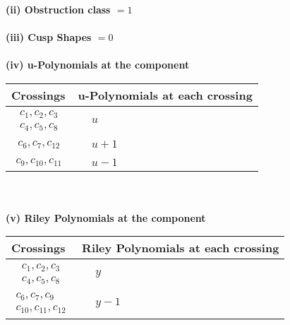 \documentclass[1p]{elsarticle_modified}
\theoremstyle{definition}
\begin{document}
\flushleft \textbf{(ii) Obstruction class $= 1$}\\~\\
\flushleft \textbf{(iii) Cusp Shapes $= 0$}\\~\\
\newpage\renewcommand{\arraystretch}{1}
\flushleft \textbf{(iv) u-Polynomials at the component}\newline \\
\begin{tabular}{m{50pt}|m{274pt}}
Crossings & \hspace{64pt}u-Polynomials at each crossing \\
\hline $$\begin{aligned}c_{1},c_{2},c_{3}\\c_{4},c_{5},c_{8}\end{aligned}$$&$\begin{aligned}
&u
\end{aligned}$\\
\hline $$\begin{aligned}c_{6},c_{7},c_{12}\end{aligned}$$&$\begin{aligned}
&u+1
\end{aligned}$\\
\hline $$\begin{aligned}c_{9},c_{10},c_{11}\end{aligned}$$&$\begin{aligned}
&u-1
\end{aligned}$\\
\hline
\end{tabular}\\~\\
\newpage\renewcommand{\arraystretch}{1}
\flushleft \textbf{(v) Riley Polynomials at the component}\newline \\
\begin{tabular}{m{50pt}|m{274pt}}
Crossings & \hspace{64pt}Riley Polynomials at each crossing \\
\hline $$\begin{aligned}c_{1},c_{2},c_{3}\\c_{4},c_{5},c_{8}\end{aligned}$$&$\begin{aligned}
&y
\end{aligned}$\\
\hline $$\begin{aligned}c_{6},c_{7},c_{9}\\c_{10},c_{11},c_{12}\end{aligned}$$&$\begin{aligned}
&y-1
\end{aligned}$\\
\hline
\end{tabular}\\~\\
\end{document}
